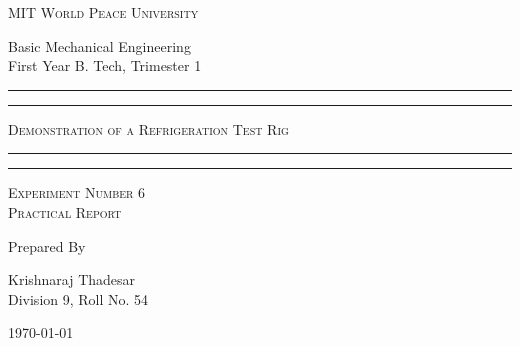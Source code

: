 \documentclass[11pt]{article}
\begin{document}
	
	\begin{titlepage} 
		\centering 
		
		
		\huge\textsc{
			MIT World Peace University
		}\\
	
		\vspace{0.75\baselineskip} %
		
		\LARGE{
			Basic Mechanical Engineering\\
			First Year B. Tech, Trimester 1
		}
		
		\vfill %
		
		
		\rule{\textwidth}{1.6pt}\vspace*{-\baselineskip}\vspace*{2pt}
		\rule{\textwidth}{0.6pt}
		\vspace{0.4\baselineskip} %
		
		
		
		\huge{\textsc{
				Demonstration of a Refrigeration Test Rig
			}} \\
		
		
		
		\vspace{0.5\baselineskip} %
		\rule{\textwidth}{0.6pt}\vspace*{-\baselineskip}\vspace*{2.8pt}
		\rule{\textwidth}{1.6pt}
		
		\vspace{1\baselineskip} %

			
		\LARGE\textsc{
			Experiment Number 6\\Practical Report
		} %
		\vfill
		
		
		Prepared By
		\vspace{0.5\baselineskip} %
		
		\Large{
			Krishnaraj Thadesar \\
			Division 9, Roll No. 54
		}
		
		
		\vspace{0.5\baselineskip} %
		\today

	\end{titlepage}
	
\end{document}
